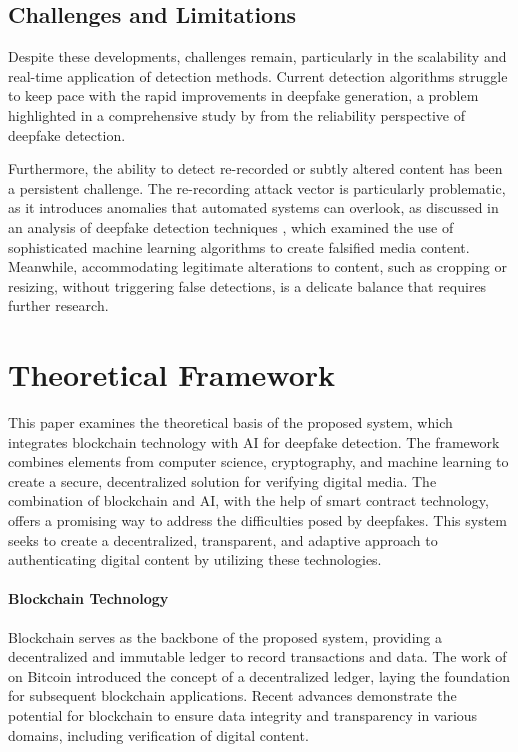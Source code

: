 \documentclass{article}
\begin{document}
\subsection{Challenges and Limitations}

Despite these developments, challenges remain, particularly in the scalability and real-time application of detection methods. Current detection algorithms struggle to keep pace with the rapid improvements in deepfake generation, a problem highlighted in a comprehensive study by \citep{wang2023deepfake} from the reliability perspective of deepfake detection.

Furthermore, the ability to detect re-recorded or subtly altered content has been a persistent challenge. The re-recording attack vector is particularly problematic, as it introduces anomalies that automated systems can overlook, as discussed in an analysis of deepfake detection techniques \citep{Nguyen_2022}, which examined the use of sophisticated machine learning algorithms to create falsified media content. Meanwhile, accommodating legitimate alterations to content, such as cropping or resizing, without triggering false detections, is a delicate balance that requires further research.

\section{Theoretical Framework}

This paper examines the theoretical basis of the proposed system, which integrates blockchain technology with AI for deepfake detection. The framework combines elements from computer science, cryptography, and machine learning to create a secure, decentralized solution for verifying digital media. The combination of blockchain and AI, with the help of smart contract technology, offers a promising way to address the difficulties posed by deepfakes. This system seeks to create a decentralized, transparent, and adaptive approach to authenticating digital content by utilizing these technologies.

\paragraph{Blockchain Technology} Blockchain serves as the backbone of the proposed system, providing a decentralized and immutable ledger to record transactions and data. The work of \citep{nakamoto2009bitcoin} on Bitcoin introduced the concept of a decentralized ledger, laying the foundation for subsequent blockchain applications. Recent advances demonstrate the potential for blockchain to ensure data integrity and transparency in various domains, including verification of digital content.
\end{document}
